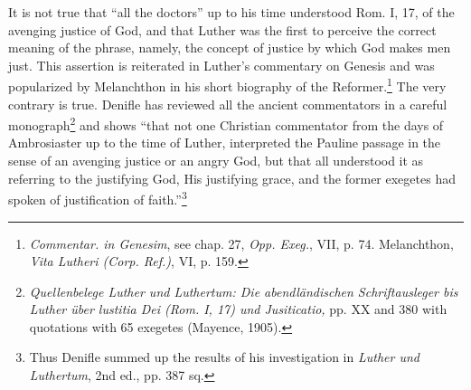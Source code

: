 It is not true that “all the doctors” up to his time understood Rom.
I, 17, of the avenging justice of God, and that Luther was the first
to perceive the correct meaning of the phrase, namely, the concept
of justice by which God makes men just. This assertion is reiterated
in Luther’s commentary on Genesis and was popularized by Melanchthon in
his short biography of the Reformer.\footnote
{\textit{Commentar. in Genesim}, see chap. 27, \textit{Opp. Exeg.}, VII, p. 74. Melanchthon, \textit{Vita
Lutheri (Corp. Ref.)}, VI, p. 159.}
The very contrary
is true. Denifle has reviewed all the ancient commentators in a
careful monograph\footnote
{\textit{Quellenbelege Luther und Luthertum: Die abendländischen Schriftausleger bis Luther
über lustitia Dei (Rom. I, 17) und Jusiticatio,} pp. XX and 380 with quotations with 65
exegetes (Mayence, 1905).}
 and shows “that not one Christian commentator
from the days of Ambrosiaster up to the time of Luther, interpreted
the Pauline passage in the sense of an avenging justice or an angry
God, but that all understood it as referring to the justifying God,
His justifying grace, and the former exegetes had spoken of justification
of faith.”\footnote
{Thus Denifle summed up the results of his investigation in \textit{Luther und Luthertum},
2nd ed., pp. 387 sq.}

